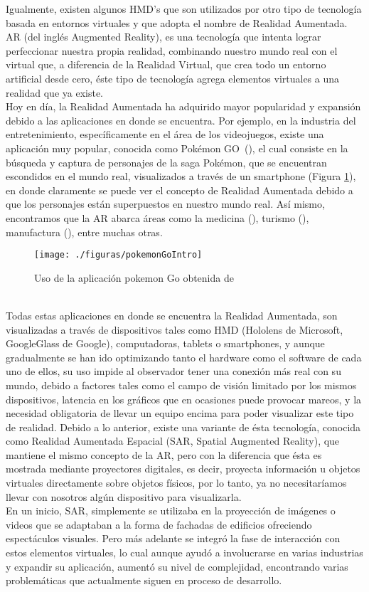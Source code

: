\documentclass[a4paper,openright,12pt]{report}
\begin{document}
Igualmente, existen algunos HMD’s que son utilizados por otro tipo de tecnología basada en entornos virtuales y que adopta el nombre de Realidad Aumentada.\\
AR (del inglés Augmented Reality), es una tecnología que intenta lograr perfeccionar nuestra propia realidad, combinando nuestro mundo real con el virtual que, a diferencia de la Realidad Virtual, que crea todo un entorno artificial desde cero, éste tipo de tecnología agrega elementos virtuales a una realidad que ya existe.\\
Hoy en día, la Realidad Aumentada ha adquirido mayor popularidad y expansión debido a las aplicaciones en donde se encuentra. Por ejemplo, en la industria del entretenimiento, específicamente en el área de los videojuegos, existe una aplicación muy popular, conocida como Pokémon GO\textcopyright\ (\cite{Dorward2017}), el cual consiste en la búsqueda y captura de personajes de la saga Pokémon, que se encuentran escondidos en el mundo real, visualizados a través de un smartphone (Figura \ref{fig:pokemonGoIntro}), en donde claramente se puede ver el concepto de Realidad Aumentada debido a que los personajes están superpuestos en nuestro mundo real. Así mismo, encontramos que la AR abarca áreas como la medicina (\cite{Marescaux2004,Ploder1995}), turismo (\cite{Kounavis2012}), manufactura (\cite{Frund2004}), entre muchas otras.
\begin{figure}[h]
	\centering
	\texttt{[image: ./figuras/pokemonGoIntro]}
	\caption{Uso de la aplicación pokemon Go obtenida de \cite{Dorward2017}} \label{fig:pokemonGoIntro}
\end{figure}\\
Todas estas aplicaciones en donde se encuentra la Realidad Aumentada, son visualizadas a través de dispositivos tales como HMD (Hololens de Microsoft, GoogleGlass de Google), computadoras, tablets o smartphones, y aunque gradualmente se han ido optimizando tanto el hardware como el software de cada uno de ellos, su uso impide al observador tener una conexión más real con su mundo, debido a factores tales como el campo de visión limitado por los mismos dispositivos, latencia en los gráficos que en ocasiones puede provocar mareos, y la necesidad obligatoria de llevar un equipo encima para poder visualizar este tipo de realidad. Debido a lo anterior, existe una variante de ésta tecnología, conocida como Realidad Aumentada Espacial (SAR, Spatial Augmented Reality), que mantiene el mismo concepto de la AR, pero con la diferencia que ésta es mostrada mediante proyectores digitales, es decir, proyecta información u objetos virtuales directamente sobre objetos físicos, por lo tanto, ya no necesitaríamos llevar con nosotros algún dispositivo para visualizarla.\\
En un inicio, SAR, simplemente se utilizaba en la proyección de imágenes o videos que se adaptaban a la forma de fachadas de edificios ofreciendo espectáculos visuales. Pero más adelante se integró la fase de interacción con estos elementos virtuales, lo cual aunque ayudó a involucrarse en varias industrias y expandir su aplicación, aumentó su nivel de complejidad, encontrando varias problemáticas que actualmente siguen en proceso de desarrollo.
\end{document}
